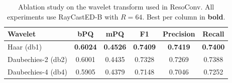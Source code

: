 \begin{table}[H]
	\centering
	\caption{Ablation study on the wavelet transform used in ResoConv. All experiments use RayCastED-B with $R=64$. Best per column in \textbf{bold}.}
	\label{tab:ablation-wavelet}
	\small
	\begin{tabular}{lccccc}
		\hline
		\textbf{Wavelet} & \textbf{bPQ} & \textbf{mPQ} & \textbf{F1} & \textbf{Precision} & \textbf{Recall} \\
		\hline
		Haar (db1)         & \textbf{0.6024} & \textbf{0.4526} & \textbf{0.7409} & \textbf{0.7419} & \textbf{0.7400} \\
		Daubechies-2 (db2) & 0.6001 & 0.4435 & 0.7328 & 0.7269 & 0.7388 \\
		Daubechies-4 (db4) & 0.5905 & 0.4379 & 0.7148 & 0.7046 & 0.7252 \\
		\hline
	\end{tabular}
\end{table}
